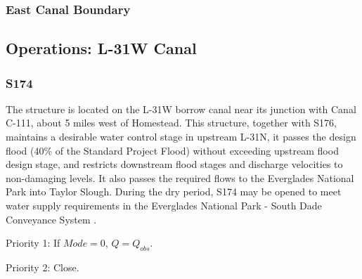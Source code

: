 \clearpage
\subsubsection{East Canal Boundary}


\clearpage
\subsection{Operations: L-31W Canal}

\subsubsection{S174}

The structure is located on the L-31W borrow canal near its junction with Canal C-111, about 5 miles west of Homestead. This structure, together with S176, maintains a desirable water control stage in upstream L-31N, it passes the design flood (40\% of the Standard Project Flood) without exceeding upstream flood design stage, and restricts downstream flood stages and discharge velocities to non-damaging levels. It also passes the required flows to the Everglades National Park into Taylor Slough. During the dry period, S174 may be opened to meet water supply requirements in the Everglades National Park - South Dade Conveyance System \cite{corp2005, SFWMD1994}.



\begin{packed_items}
\item[]
\item Priority 1: If $Mode=0$, $Q = Q_{obs}$.
\item Priority 2: Close.
\end{packed_items}

